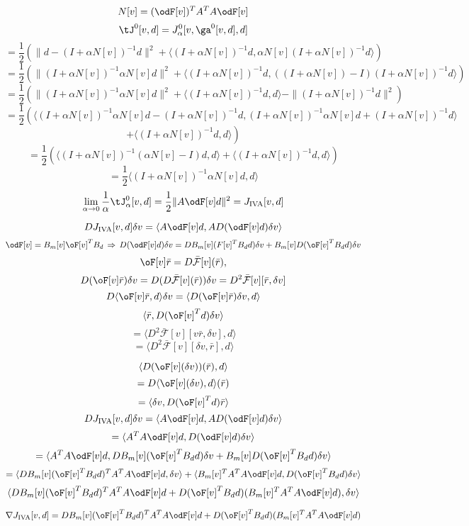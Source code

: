 \begin{equation}
\label{eqn:normop}
N[v] = (\odF[v])^TA^TA\odF[v]
\end{equation}
\begin{equation}
\label{eqn:red}
\tJ^0[v,d]=J_{\alpha}^0[v,\ga^0[v,d],d]
\end{equation}
\[
= \frac{1}{2}(\|d - (I+\alpha N[v])^{-1}d\|^2 + \langle (I+\alpha N[v])^{-1}d, \alpha N[v](I+\alpha N[v])^{-1}d\rangle)
\]
\[
= \frac{1}{2}(\|(I+\alpha N[v])^{-1}\alpha N[v]d\|^2 +  \langle (I+\alpha N[v])^{-1}d, ((I + \alpha N[v]) - I) (I+\alpha N[v])^{-1}d \rangle)
\]
\[
=\frac{1}{2}(\|(I+\alpha N[v])^{-1}\alpha N[v]d\|^2 + \langle (I+\alpha N[v])^{-1}d,d\rangle - \|(I+\alpha N[v])^{-1}d\|^2)
\]
\[
=\frac{1}{2}\left( \langle (I+\alpha N[v])^{-1}\alpha N[v]d - (I+\alpha
N[v])^{-1}d,  (I+\alpha N[v])^{-1}\alpha N[v]d + (I+\alpha
N[v])^{-1}d \rangle \right.
\]
\[
\left.+ \langle (I+\alpha N[v])^{-1}d,d\rangle \right)
\]
\[
=\frac{1}{2}\left( \langle (I+\alpha N[v])^{-1}(\alpha
  N[v]-I)d,d\rangle + \langle (I+\alpha N[v])^{-1}d,d\rangle \right)
\]
\[
=\frac{1}{2}\langle (I+\alpha N[v])^{-1}\alpha
  N[v]d,d\rangle
\]
\begin{equation}
\label{eqn:iva}
\lim_{\alpha \rightarrow 0} \frac{1}{\alpha}\tJ^0_{\alpha}[v,d] =
\frac{1}{2}\|A\odF[v]d\|^2 = J_{\rm IVA}[v,d]
\end{equation}

\[
DJ_{\rm IVA}[v,d]\delta v = \langle A \odF[v]d,AD(\odF[v]d)\delta
v\rangle
\]
\[
\odF[v] = B_m[v] \oF[v]^T B_d \,\Rightarrow \, D(\odF[v]d)\delta v =
DB_m[v](F[v]^T B_dd)\delta v + B_m[v]D(\oF[v]^T B_dd) \delta v
\]
\[
\oF[v] \bar{r}= 
D\bar{\mathcal{F}}[v] (\bar{r}), 
\]
\[
D(\oF[v]\bar{r})\delta v =
D(D\bar{\mathcal{F}}[v](\bar{r}))\delta v =
D^2\bar{\mathcal{F}}[v][\bar{r},\delta v]
\]
\[
D\langle \oF[v]\bar{r},d \rangle\delta v = \langle
D(\oF[v]\bar{r})\delta v, d\rangle
\]
\[
\langle \bar{r},D(\oF[v]^Td)\delta v \rangle
\]
\[
=\langle D^2\bar{\mathcal{F}}[v][v\bar{r},\delta v],d \rangle
\]
\[
=\langle D^2\bar{\mathcal{F}}[v][\delta v ,\bar{r}],d \rangle
\]

\[
\langle D(\oF[v](\delta v))(\bar{r}),d\rangle
\]
\[
= D\langle \oF[v](\delta v),d \rangle (\bar{r})
\]
\[
= \langle \delta v, D(\oF[v]^Td) \bar{r} \rangle
\]
\[
DJ_{\rm IVA}[v,d]\delta v = \langle A \odF[v]d,AD(\odF[v]d)\delta
v\rangle
\]
\[
= \langle A^TA \odF[v]d, D(\odF[v]d) \delta v \rangle 
\]
\[
= \langle A^TA \odF[v]d, DB_m[v](\oF[v]^T B_dd)\delta v +
B_m[v]D(\oF[v]^T B_dd) \delta v \rangle
\]
\[
= \langle DB_m[v](\oF[v]^T B_dd)^TA^TA \odF[v] d,\delta v \rangle 
+\langle B_m[v]^TA^TA \odF[v] d, D(\oF[v]^T B_dd) \delta v \rangle 
\]
\[
\langle DB_m[v](\oF[v]^T B_dd)^TA^TA \odF[v] d  + D(\oF[v]^TB_dd)(B_m[v]^TA^TA \odF[v] d), \delta v \rangle 
\]

\begin{equation}
\label{eqn:ivagrad}
\nabla J_{\rm IVA}[v,d] = DB_m[v](\oF[v]^T B_dd)^TA^TA \odF[v] d  +
D(\oF[v]^TB_dd)(B_m[v]^TA^TA \odF[v] d)
\end{equation}




